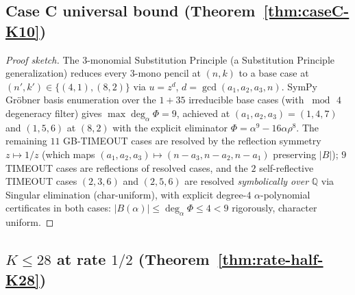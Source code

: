 \documentclass[11pt]{article}
\theoremstyle{definition}
\theoremstyle{remark}
\begin{document}
\subsection{Case C universal bound (Theorem~\ref{thm:caseC-K10})}
\label{prf:thm:caseC-K10}

\begin{proof}[Proof sketch]
The $3$-monomial Substitution Principle (a Substitution Principle generalization)
reduces every $3$-mono pencil at $(n, k)$ to a base case at
$(n', k') \in \{(4, 1), (8, 2)\}$ via $u = z^d$, $d = \gcd(a_1, a_2,
a_3, n)$. SymPy Gröbner basis enumeration over the $1 + 35$
irreducible base cases (with $\bmod\,4$ degeneracy filter) gives
$\max \deg_\alpha \Phi = 9$, achieved at $(a_1, a_2, a_3) = (1, 4, 7)$
and $(1, 5, 6)$ at $(8, 2)$ with the explicit eliminator
$\Phi = \alpha^9 - 16\alpha\rho^8$. The remaining $11$ GB-TIMEOUT
cases are resolved by the reflection symmetry $z \mapsto 1/z$
(which maps $(a_1, a_2, a_3) \mapsto (n - a_3, n - a_2, n - a_1)$
preserving $|B|$); $9$ TIMEOUT cases are reflections of resolved
cases, and the $2$ self-reflective TIMEOUT cases $(2, 3, 6)$ and
$(2, 5, 6)$ are resolved \emph{symbolically over} $\mathbb{Q}$ via
Singular elimination (char-uniform), with
explicit degree-$4$ $\alpha$-polynomial certificates in both cases:
$|B(\alpha)| \leq \deg_\alpha \Phi \leq 4 < 9$ rigorously, character
uniform.
\end{proof}

\subsection{$K \leq 28$ at rate $1/2$ (Theorem~\ref{thm:rate-half-K28})}
\label{prf:thm:rate-half-K28}
\end{document}
